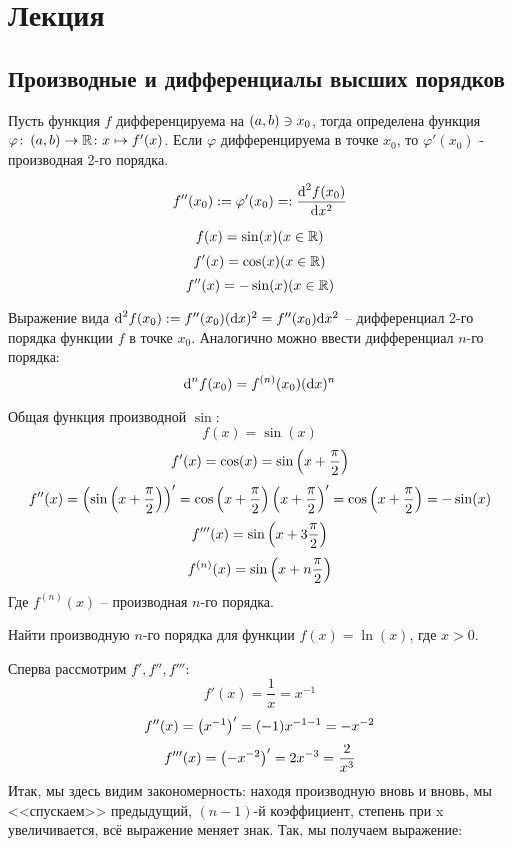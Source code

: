 \section{Лекция}
\subsection{Производные и дифференциалы высших порядков}
\begin{definition}
    Пусть функция \( f \) дифференцируема на \( \left( a, b \right) \ni x_0 \), тогда определена функция \( \varphi\colon \left( a, b \right) \to \mathbb{R} \colon x \mapsto f'(x) \). Если \( \varphi \) дифференцируема в точке \( x_0 \), то \( \varphi'(x_0) \) - производная 2-го порядка.
\end{definition}
\begin{dsg} 
    \[ f''(x_0) := \varphi'(x_0) =: \frac{\text{d}^2f(x_0)}{\text{d} x^2}\]
\end{dsg}
\begin{example}
    \[ f(x)  = \sin(x) (x \in \mathbb{R}) \]
    \[ f'(x) = \cos(x) (x \in \mathbb{R}) \]
    \[ f''(x)=-\sin(x) (x \in \mathbb{R}) \]
\end{example}
\begin{definition} 
    Выражение вида \( \text{d}^2f(x_0) := f''(x_0)(\text{d} x)^2 = f''(x_0)\text{d} x^2 \) -- дифференциал 2-го порядка функции \( f \) в точке \( x_0 \). Аналогично можно ввести дифференциал \( n \)-го порядка: \[ \text{d}^nf(x_0) = f^{(n)}(x_0)(\text{d} x)^n \]
\end{definition}
\begin{example} 
    Общая функция производной \( \sin \):
    \[ f(x) = \sin(x) \]
    \[ f'(x) = \cos(x) = \sin\left( x + \frac{\pi}{2} \right) \]
    \[ f''(x) = \left( \sin\left( x + \frac{\pi}{2} \right) \right)' = \cos\left( x + \frac{\pi}{2} \right)\left( x+\frac{\pi}{2} \right)' = \cos\left( x+\frac{\pi}{2} \right) = -\sin(x) \]
    \[ f'''(x) = \sin{\left( x + 3\frac{\pi}{2} \right)} \]
    \[ f^{(n)}(x)=\sin{\left( x+n\frac{\pi}{2} \right)} \]
    Где \( f^{(n)}(x) \) -- производная \( n \)-го порядка.
\end{example}
\begin{problem} 
    Найти производную \( n \)-го порядка для функции \( f(x) = \ln(x) \), где \( x > 0 \).
\end{problem}
Сперва рассмотрим \( f', f'', f''' \):
\[ f'(x) = \frac{1}{x} = x^{-1} \]
\[ f''(x) = \left( x^{-1} \right)' = (-1)x^{-1-1} = -x^{-2} \]
\[ f'''(x) = \left( -x^{-2} \right)' = 2x^{-3} = \frac{2}{x^3} \]
Итак, мы здесь видим закономерность: находя производную вновь и вновь, мы <<спускаем>> предыдущий, \( (n-1) \)-й коэффициент, степень при x увеличивается, всё выражение меняет знак. Так, мы получаем выражение:
